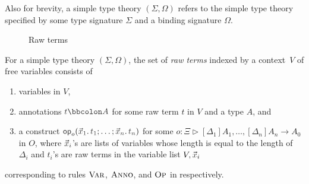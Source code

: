 Also for brevity, a simple type theory $(\Sigma, \Omega)$ refers to the simple type theory specified by some type signature $\Sigma$ and a binding signature $\Omega$. 

\begin{definition}
\begin{figure}
  \centering
  \small
  \caption{Raw terms}
  \label{fig:raw-terms}
\end{figure}
  For a simple type theory $(\Sigma, \Omega)$, the set of \emph{raw terms} indexed by a context~$V$ of free variables consists of
  \begin{enumerate}
    \item variables in $V$,
    \item annotations $\isTerm{t \annotate A}$ for some raw term $t$ in $V$ and a type $A$, and
    \item a construct $\tmOpts$ for some $o \colon \Xi \rhd [\Delta_1]A_{1}, \ldots, [\Delta_{n}] A_{n} \to A_0$ in $O$, where $\vars{x}_{\isTerm{i}}$'s are lists of variables whose length is equal to the length of~$\Delta_i$ and $t_i$'s are raw terms in the variable list $V, \vars{x}_i$
  \end{enumerate}
  corresponding to rules $\textnormal{\textsc{Var}}$, $\textnormal{\textsc{Anno}}$, and $\textnormal{\textsc{Op}}$ in  respectively.
\end{definition}


